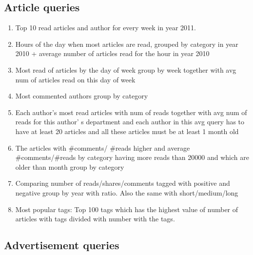 \subsection*{Article queries} %
\label{sub:Article  queries}
\begin{enumerate}
\item    Top 10 read articles and author for every week in year 2011.
\item    Hours of the day when most articles are read, grouped by category in year 2010 + average number of articles read for the hour in year 2010
\item    Most read of articles by the day of week group by week together with avg num of articles read on this day of week
\item    Most commented authors group by category
\item    Each author’s most read articles with num of reads together with avg num of reads for this author’ s department and each author in this avg query has to have at least 20 articles and all these articles must be at least 1 month old
\item    The articles with  \#comments/ \#reads higher and average \#comments/\#reads by category having more reads  than 20000 and which are older than month group by category
\item    Comparing number of reads/shares/comments tagged with positive and negative group by year with ratio. Also the same with short/medium/long
\item    Most popular tags:  Top 100 tags which has the highest value of number of articles with tags divided with number with the tags.
\end{enumerate}

\subsection*{Advertisement  queries} %
\label{sub:Advertisement queries}

